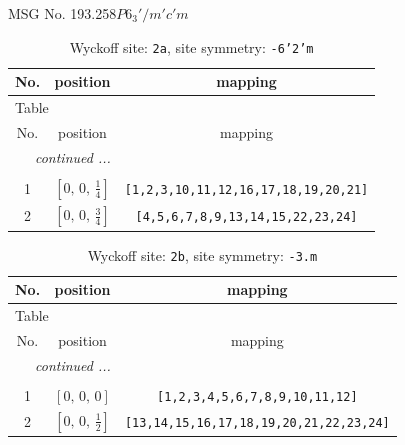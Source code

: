 \documentclass[fleqn,8pt]{jsarticle}
\begin{document}
\setcounter{MaxMatrixCols}{32}

\renewcommand{\tablename}{Table~}
\renewcommand{\figurename}{Figure~}
\begin{center}
\LARGE
MSG No. 193.258\quad$P6_{3}'/m'c'm$
\end{center}
\renewcommand{\arraystretch}{1.2}
\begin{longtable}{ccc}
\caption{Wyckoff site: {\tt 2a}, site symmetry: {\tt -6'2'm}}
 \\
 \hline \hline
No. & position & mapping \\ \hline \endfirsthead

\multicolumn{2}{l}{\tablename\ \thetable{}} \\
 \hline \hline
No. & position & mapping \\ \hline \endhead

 \hline \hline
\multicolumn{2}{r}{\footnotesize\it continued ...} \\ \endfoot

 \hline \hline
\multicolumn{2}{r}{} \\ \endlastfoot

1 & $\left[ 0,\, 0,\, \frac{1}{4} \right]$ & {\tt [1,2,3,10,11,12,16,17,18,19,20,21]} \\ \hline
2 & $\left[ 0,\, 0,\, \frac{3}{4} \right]$ & {\tt [4,5,6,7,8,9,13,14,15,22,23,24]} \\
\end{longtable}
\renewcommand{\arraystretch}{1.2}
\begin{longtable}{ccc}
\caption{Wyckoff site: {\tt 2b}, site symmetry: {\tt -3.m}}
 \\
 \hline \hline
No. & position & mapping \\ \hline \endfirsthead

\multicolumn{2}{l}{\tablename\ \thetable{}} \\
 \hline \hline
No. & position & mapping \\ \hline \endhead

 \hline \hline
\multicolumn{2}{r}{\footnotesize\it continued ...} \\ \endfoot

 \hline \hline
\multicolumn{2}{r}{} \\ \endlastfoot

1 & $\left[ 0,\, 0,\, 0 \right]$ & {\tt [1,2,3,4,5,6,7,8,9,10,11,12]} \\ \hline
2 & $\left[ 0,\, 0,\, \frac{1}{2} \right]$ & {\tt [13,14,15,16,17,18,19,20,21,22,23,24]} \\
\end{longtable}
\end{document}
